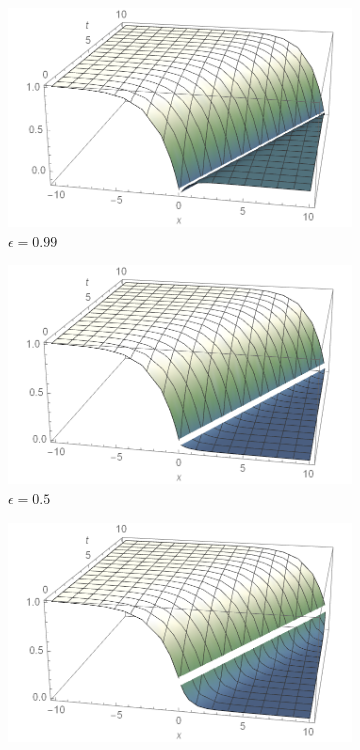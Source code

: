 \documentclass[12pt]{article}
\begin{document}
\begin{figure}[H]
    \centering
    \begin{subfigure}[h]{0.4\textwidth}
        \includegraphics[width=\textwidth]{Part2Plots/e099}
        \caption{$\epsilon=0.99$}
        \label{fig:e099}
    \end{subfigure}
    \begin{subfigure}[h]{0.4\textwidth}
        \includegraphics[width=\textwidth]{Part2Plots/e05}
        \caption{$\epsilon=0.5$}
        \label{fig:e05}
    \end{subfigure}
    \begin{subfigure}[h]{0.4\textwidth}
        \includegraphics[width=\textwidth]{Part2Plots/e001}

\end{subfigure}
\end{figure}
\end{document}
